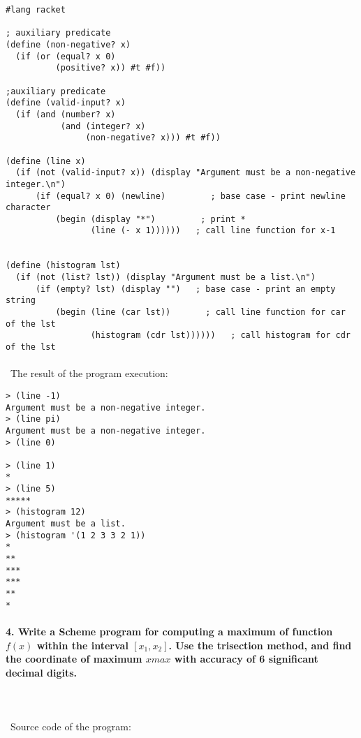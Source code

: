 \documentclass{article}
\begin{document}
\begin{verbatim} 
#lang racket

; auxiliary predicate
(define (non-negative? x)
  (if (or (equal? x 0)
          (positive? x)) #t #f))

;auxiliary predicate
(define (valid-input? x)
  (if (and (number? x)
           (and (integer? x)
                (non-negative? x))) #t #f))

(define (line x)
  (if (not (valid-input? x)) (display "Argument must be a non-negative integer.\n")
      (if (equal? x 0) (newline)	     ; base case - print newline character
          (begin (display "*")	       ; print *
                 (line (- x 1))))))	  ; call line function for x-1

      
(define (histogram lst)
  (if (not (list? lst)) (display "Argument must be a list.\n")
      (if (empty? lst) (display "")	  ; base case - print an empty string
          (begin (line (car lst))	    ; call line function for car of the lst
                 (histogram (cdr lst))))))   ; call histogram for cdr of the lst      
\end{verbatim}

\paragraph{}\
	The result of the program execution:
	
\begin{verbatim} 
> (line -1)
Argument must be a non-negative integer.
> (line pi)
Argument must be a non-negative integer.
> (line 0)

> (line 1)
*
> (line 5)
*****
> (histogram 12)
Argument must be a list.
> (histogram '(1 2 3 3 2 1))
*
**
***
***
**
*
\end{verbatim}

\paragraph{4. Write a Scheme program for computing a maximum of function \(f(x)\) within the interval \([x_1, x_2]\). Use the trisection method, and find the coordinate of maximum \(xmax\) with accuracy of 6 significant decimal digits.}\

\paragraph{}\
Source code of the program:
\end{document}
